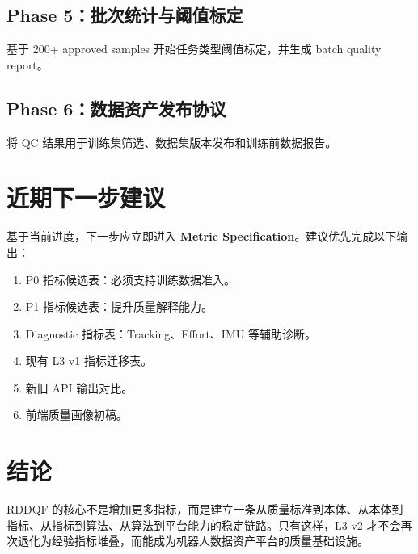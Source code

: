 \documentclass[UTF8,zihao=-4]{ctexart}
\newcommand{\Term}[1]{\textbf{#1}}
\begin{document}
\subsection{Phase 5：批次统计与阈值标定}

基于 200+ approved samples 开始任务类型阈值标定，并生成 batch quality report。

\subsection{Phase 6：数据资产发布协议}

将 QC 结果用于训练集筛选、数据集版本发布和训练前数据报告。

\section{近期下一步建议}

基于当前进度，下一步应立即进入 \Term{Metric Specification}。建议优先完成以下输出：

\begin{enumerate}
  \item P0 指标候选表：必须支持训练数据准入。
  \item P1 指标候选表：提升质量解释能力。
  \item Diagnostic 指标表：Tracking、Effort、IMU 等辅助诊断。
  \item 现有 L3 v1 指标迁移表。
  \item 新旧 API 输出对比。
  \item 前端质量画像初稿。
\end{enumerate}

\section{结论}

RDDQF 的核心不是增加更多指标，而是建立一条从质量标准到本体、从本体到指标、从指标到算法、从算法到平台能力的稳定链路。只有这样，L3 v2 才不会再次退化为经验指标堆叠，而能成为机器人数据资产平台的质量基础设施。
\end{document}
